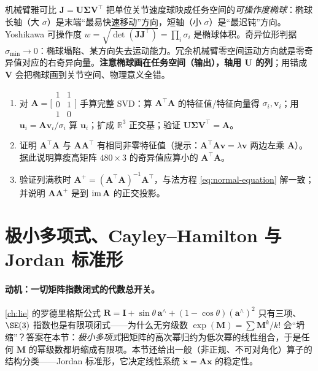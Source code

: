 \begin{example}[可操作度椭球与奇异位形]\label{ex:manipulability}
机械臂雅可比 $\mathbf{J}=\mathbf{U}\boldsymbol{\Sigma}\mathbf{V}^\top$ 把单位关节速度球映成任务空间的\emph{可操作度椭球}：椭球长轴（大 $\sigma$）是末端“最易快速移动”方向，短轴（小 $\sigma$）是“最迟钝”方向。Yoshikawa 可操作度 $w=\sqrt{\det(\mathbf{J}\mathbf{J}^\top)}=\prod_i\sigma_i$ 是椭球体积。奇异位形判据 $\sigma_{\min}\to0$：椭球塌陷、某方向失去运动能力。冗余机械臂零空间运动方向就是零奇异值对应的右奇异向量。\textbf{注意椭球画在任务空间（输出），轴用 $\mathbf{U}$ 的列}；用错成 $\mathbf{V}$ 会把椭球画到关节空间、物理意义全错。
\end{example}

\begin{practice}
\begin{enumerate}
  \item 对 $\mathbf{A}=\bigl[\begin{smallmatrix}1&1\\0&1\\1&0\end{smallmatrix}\bigr]$ 手算完整 SVD：算 $\mathbf{A}^\top\mathbf{A}$ 的特征值/特征向量得 $\sigma_i,\mathbf{v}_i$；用 $\mathbf{u}_i=\mathbf{A}\mathbf{v}_i/\sigma_i$ 算 $\mathbf{u}_i$；扩成 $\mathbb{R}^3$ 正交基；验证 $\mathbf{U}\boldsymbol{\Sigma}\mathbf{V}^\top=\mathbf{A}$。
  \item 证明 $\mathbf{A}^\top\mathbf{A}$ 与 $\mathbf{A}\mathbf{A}^\top$ 有相同非零特征值（提示：$\mathbf{A}^\top\mathbf{A}\mathbf{v}=\lambda\mathbf{v}$ 两边左乘 $\mathbf{A}$）。据此说明算瘦高矩阵 $480\times3$ 的奇异值应算小的 $\mathbf{A}^\top\mathbf{A}$。
  \item 验证列满秩时 $\mathbf{A}^+=(\mathbf{A}^\top\mathbf{A})^{-1}\mathbf{A}^\top$，与法方程 \cref{eq:normal-equation} 解一致；并说明 $\mathbf{A}\mathbf{A}^+$ 是到 $\operatorname{im}\mathbf{A}$ 的正交投影。
\end{enumerate}
\end{practice}

\section{极小多项式、Cayley--Hamilton 与 Jordan 标准形}
\label{sec:jordan}

\paragraph{动机：一切矩阵指数闭式的代数总开关。}
\cref{ch:lie} 的罗德里格斯公式 $\mathbf{R}=\mathbf{I}+\sin\theta\,\mathbf{a}^\wedge+(1-\cos\theta)(\mathbf{a}^\wedge)^2$ 只有三项、$\SE(3)$ 指数也是有限项闭式——为什么无穷级数 $\exp(\mathbf{M})=\sum\mathbf{M}^k/k!$ 会“坍缩”？答案在本节：\emph{极小多项式}把矩阵的高次幂归约为低次幂的线性组合，于是任何 $\mathbf{M}$ 的幂级数都坍缩成有限项。本节还给出一般（非正规、不可对角化）算子的结构分类——Jordan 标准形，它决定线性系统 $\dot{\mathbf{x}}=\mathbf{A}\mathbf{x}$ 的稳定性。

